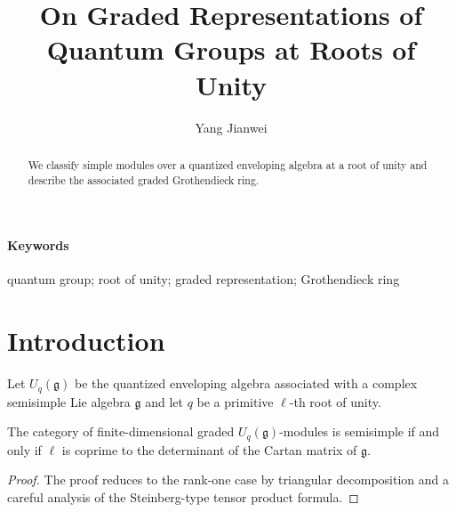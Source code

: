 





























\title{On Graded Representations of Quantum Groups at Roots of Unity}
\author{Yang Jianwei}
\date{}

\maketitle
\ifdefined\YTfallback
\noindent{}
\bigskip
\fi
\begin{abstract}
We classify simple modules over a quantized enveloping algebra at a root of unity and describe the associated graded Grothendieck ring.
\end{abstract}
\paragraph{Keywords} quantum group; root of unity; graded representation; Grothendieck ring

\section{Introduction}
Let $U_q(\mathfrak{g})$ be the quantized enveloping algebra associated with a complex semisimple Lie algebra $\mathfrak{g}$ and let $q$ be a primitive $\ell$-th root of unity.

\begin{theorem}
The category of finite-dimensional graded $U_q(\mathfrak{g})$-modules is semisimple if and only if $\ell$ is coprime to the determinant of the Cartan matrix of $\mathfrak{g}$.
\end{theorem}

\begin{proof}
The proof reduces to the rank-one case by triangular decomposition and a careful analysis of the Steinberg-type tensor product formula.
\end{proof}

